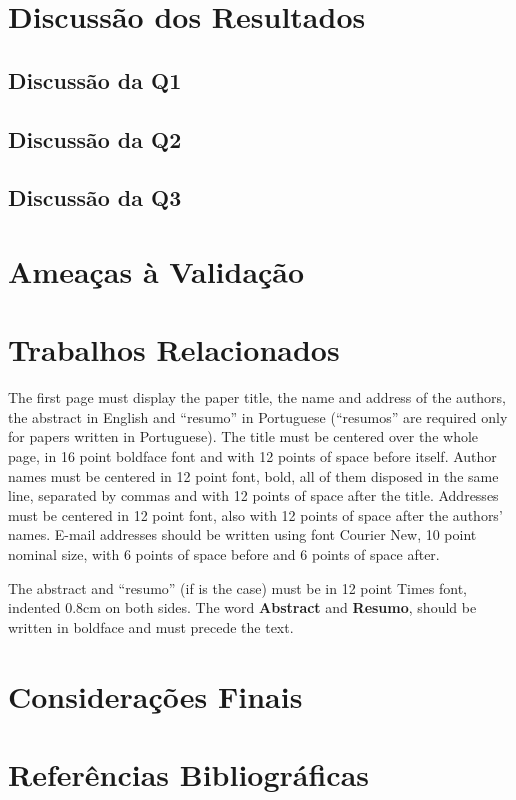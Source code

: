 \documentclass[12pt]{article}
\begin{document}
\section{Discussão dos Resultados}
\label{section:discussao}

\subsection{Discussão da Q1}

\subsection{Discussão da Q2}

\subsection{Discussão da Q3}


\section{Ameaças à Validação}
\label{section:limitacoes}



\section{Trabalhos Relacionados} 
\label{section:relacionados}

The first page must display the paper title, the name and address of the
authors, the abstract in English and ``resumo'' in Portuguese (``resumos'' are
required only for papers written in Portuguese). The title must be centered
over the whole page, in 16 point boldface font and with 12 points of space
before itself. Author names must be centered in 12 point font, bold, all of
them disposed in the same line, separated by commas and with 12 points of
space after the title. Addresses must be centered in 12 point font, also with
12 points of space after the authors' names. E-mail addresses should be
written using font Courier New, 10 point nominal size, with 6 points of space
before and 6 points of space after.

The abstract and ``resumo'' (if is the case) must be in 12 point Times font,
indented 0.8cm on both sides. The word \textbf{Abstract} and \textbf{Resumo},
should be written in boldface and must precede the text.


\section{Considerações Finais}
\label{section:consideracoes}

\section{Referências Bibliográficas}



\end{document}
